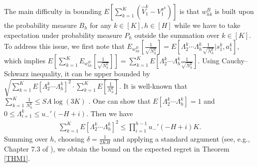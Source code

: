 \documentclass[11pt]{article}
\newcommand{\1}{\mathbbm{1}}
\newcommand{\gao}[1]{\textcolor{blue}{{#1}}} %
\begin{document}
The main difficulty in bounding $E[\sum_{k=1}^K(\hat{V}_1^k-V_1^{\pi^k})]$ is that $w_{hk}^B$ is built upon the probability measure $B_h$ for any $k\in [K],h\in [H]$ while we have to take expectation under probability measure $P_h$ outside the summation over $k\in [K]$. To address this issue, we first note that $E_{w_{hk}^B}\left[\frac{1}{\sqrt{N_h^k}}\right] = E\left[\Lambda_2^k\cdots \Lambda_h^k \frac{1}{\sqrt{N_h^k}}\Bigg\vert s_1^k,a_1^k\right]$, which implies $E\left[\sum_{k=1}^K E_{w_{hk}^B}\left[\frac{1}{\sqrt{N_h^k}}\right]\right] = 
\sum_{k=1}^K E\left[\Lambda_2^k\cdots \Lambda_h^k \frac{1}{\sqrt{N_h^k}}\right].$
Using Cauchy–Schwarz inequality, it can be upper bounded by $\sqrt{\sum_{k=1}^K E[\Lambda_2^k\cdots \Lambda_h^k]^2\cdot \sum_{k=1}^K E\left[\frac{1}{N_h^k}\right]}$. It is well-known that $\sum_{k=1}^K\frac{1}{N_h^k} \le SA \log(3K)$ \citep{azar2017minimax}. One can show that $E[\Lambda_2^k\cdots \Lambda_h^k]=1$ and $0 \le \Lambda_{i+1}^k \le u_{-}'(-H+i)$. Then we have 
\begin{align}\label{eq:radon}
\sum_{k=1}^K E[\Lambda_2^k\cdots \Lambda_h^k]^2 \le \prod\limits_{i=1}^{h-1} u_{-}'(-H+i)K.
\end{align}
Summing over $h$, choosing
$\delta=\frac{1}{2KH}$ and applying a standard argument (see, e.g., Chapter 7.3 of \cite{agarwal2019reinforcement} ), we obtain the bound on the expected regret in Theorem \ref{THM1}.


\end{document}
